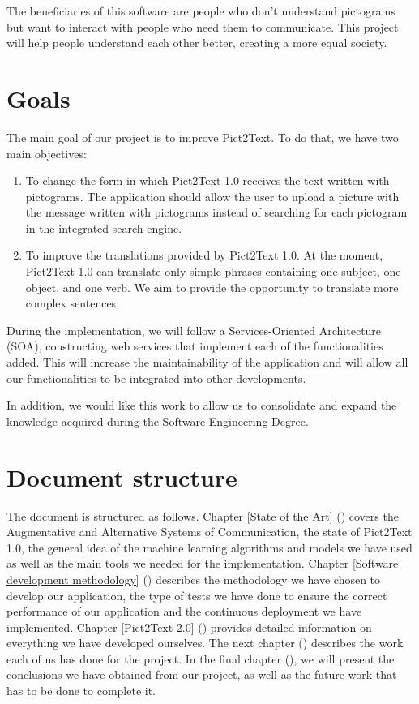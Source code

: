 The beneficiaries of this software are people who don't understand pictograms but want to interact with people who need them to communicate. This project will help people understand each other better, creating a more equal society.

\section{Goals}
\label{Goals}

The main goal of our project is to improve Pict2Text. To do that, we have two main objectives:
\begin{enumerate}
\item To change the form in which Pict2Text 1.0 receives the text written with pictograms. The application should allow the user to upload a picture with the message written with pictograms instead of searching for each pictogram in the integrated search engine.
\item To improve the translations provided by Pict2Text 1.0. At the moment, Pict2Text 1.0 can translate only simple phrases containing one subject, one object, and one verb. We aim to provide the opportunity to translate more complex sentences.
\end{enumerate}

During the implementation, we will follow a Services-Oriented Architecture (SOA), constructing web services that implement each of the functionalities added. This will increase the maintainability of the application and will allow all our functionalities to be integrated into other developments.

In addition, we would like this work to allow us to consolidate and expand the knowledge acquired during the Software Engineering Degree.

\section{Document structure}
\label{Document structure}

The document is structured as follows. Chapter \ref{State of the Art} () covers the Augmentative and Alternative Systems of Communication, the state of Pict2Text 1.0, the general idea of the machine learning algorithms and models we have used as well as the main tools we needed for the implementation. Chapter \ref{Software development methodology} () describes the methodology we have chosen to develop our application, the type of tests we have done to ensure the correct performance of our application and the continuous deployment we have implemented. Chapter \ref{Pict2Text 2.0} () provides detailed information on everything we have developed ourselves. The next chapter () describes the work each of us has done for the project. In the final chapter (), we will present the conclusions we have obtained from our project, as well as the future work that has to be done to complete it.







